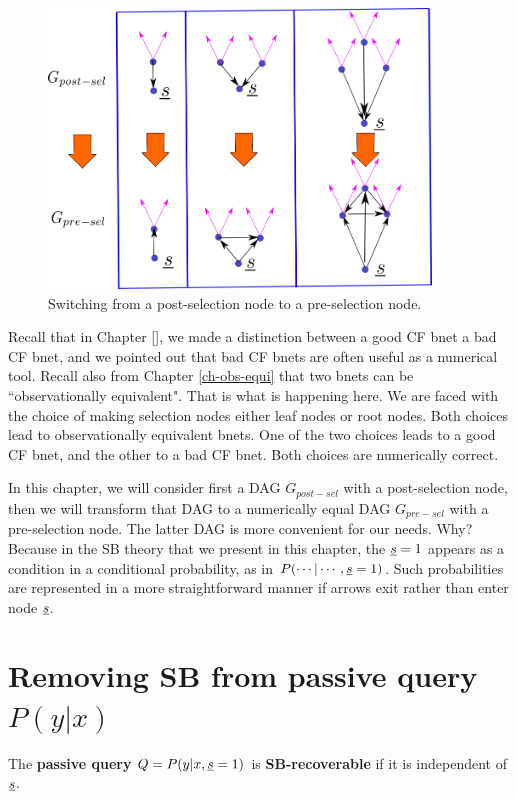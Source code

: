 \begin{figure}[h!]
\centering
\includegraphics[width=4in]
{sb-removal/sel-nd-reversal.png}
\caption{Switching
from a post-selection node
to a pre-selection node.}
\label{fig-sel-nd-reversal}
\end{figure}

Recall that in Chapter [],
we made a distinction
between a good CF bnet
a bad CF bnet, and
we pointed out
that bad CF bnets are
often useful as
a numerical tool.
Recall also from Chapter
\ref{ch-obs-equi}
that two bnets can be
``observationally equivalent".
That is what is happening here.
We are faced with
the choice of
making selection nodes
either
leaf nodes or root nodes.
Both
choices  lead to observationally
equivalent bnets.
One of the two choices
leads to a good
CF bnet,
and the other to a bad CF bnet.
Both choices are numerically
correct.

In this
chapter,
we will consider
first a DAG $G_{post-sel}$ with a post-selection
node, then we will transform that
DAG to a numerically equal
DAG $G_{pre-sel}$
with a pre-selection node.
The latter DAG
is more convenient
for our needs. Why?
Because
in the SB theory
that we present in this chapter, the
${\underline{s}}=1$
appears as a condition in a conditional
probability,
as in $P(\cdots|\cdots, {\underline{s}}=1)$.
Such probabilities
are represented  in a more
straightforward manner if arrows
exit rather than enter node
${\underline{s}}$.




\section{Removing SB from
passive query $P(y|x)$}

The {\bf  passive query} $Q=P(y|x, {\underline{s}}=1)$
is {\bf SB-recoverable}
if it is independent of ${\underline{s}}$.







